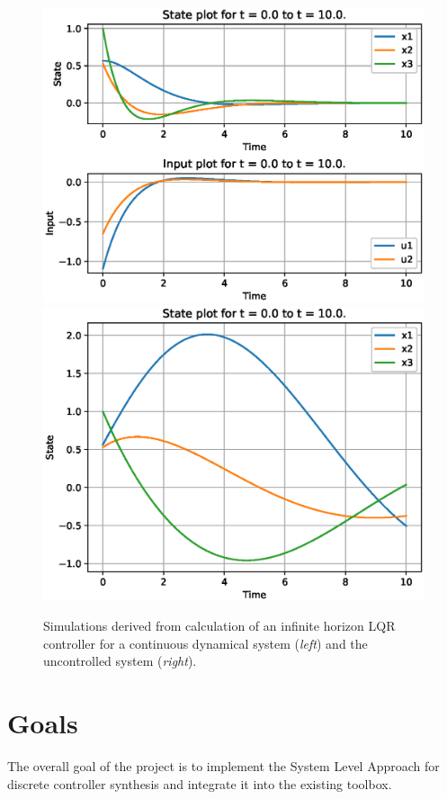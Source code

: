 \documentclass[11pt,a4paper]{article}
\begin{document}
\begin{figure}[H]
	\centering	
		\includegraphics[scale=0.48]{inf_lqr_cont_4}
		\includegraphics[scale=0.48]{cont_plot}

	\caption{Simulations derived from calculation of an infinite horizon LQR controller for a continuous dynamical system (\textit{left}) and the uncontrolled system (\textit{right}).}
	\label{inf_lqr_cont}
\end{figure}


\section*{Goals}
The overall goal of the project is to implement the System Level Approach for discrete controller synthesis and integrate it into the existing toolbox.
\end{document}
